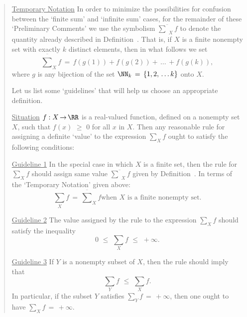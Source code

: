 \begin{quotation}
{\VV

        \underline{Temporary Notation} In order to minimize the possibilities for confusion between the `finite sum' and `infinite sum' cases,
    for the remainder of these `Preliminary Comments' we use the symbolism ${\displaystyle \overline{{\sum}}_{X}} f$ to denote the quantity already described in Definition~.
    That is, if $X$ is a finite nonempty set with exactly $k$ distinct elements, then in what follows we set
        \begin{displaymath}
        \overline{{\sum}}_{X} f \,=\, f(g(1)) + f(g(2)) + \,{\ldots}\,+ f(g(k)),
        \end{displaymath}
    where $g$ is any bijection of the set ${\NN}_{k} \,=\, \{1,2,\,{\ldots}\,k\}$ onto $X$.

\V

        Let us list some `guidelines' that will help us choose an appropriate definition.

\V

        \underline{Situation} $f:X \,{\rightarrow}\, {\RR}$ is a real-valued function, defined on a nonempty set $X$, such that $f(x)\,\,{\geq}\,\,0$ for all $x$ in $X$.
    Then any reasonable rule for assigning a definite `value' to the expression ${\sum}_{X} f$ ought to satisfy the following conditions:

\V

        \underline{Guideline 1} In the special case in which $X$ is a finite set, then the rule for ${\sum}_{X} f$ should assign same value $\overline{{\sum}}_{X} f$ given by Definition~.
    In terms of the `Temporary Notation' given above:
        \begin{displaymath}
        {\sum}_{X} f \,=\, \overline{{\sum}}_{X} f \mbox{when $X$ is a finite nonempty set}.
        \end{displaymath}

\V

        \underline{Guideline 2} The value assigned by the rule to the expression ${\sum}_{X} f$ should satisfy the inequality
        \begin{displaymath}
        0\,\,{\leq}\,\,{\sum}_{X} f\,\,{\leq}\,\,+{\infty}.
        \end{displaymath}

\V

        \underline{Guideline 3} If $Y$ is a nonempty subset of $X$, then the rule should imply that
        \begin{displaymath}
        {\sum}_{Y} f\,\,{\leq}\,\,{\sum}_{X} f.
        \end{displaymath}
    In particular, if the subset $Y$ satisfies ${\sum}_{Y} f \,=\, +{\infty}$, then one ought to have ${\sum}_{X} f \,=\, +{\infty}$.

}
\end{quotation}
